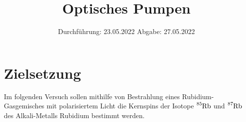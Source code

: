 

\def\Rb#1{\ce{^{#1}Rb}}

\subject{V21}
\title{Optisches Pumpen}
\date{
    Durchführung: 23.05.2022
     \hspace{3em}
    Abgabe: 27.05.2022
}


\maketitle
\thispagestyle{empty}
\tableofcontents
\newpage

\section{Zielsetzung}

    Im folgenden Versuch sollen mithilfe von Bestrahlung eines Rubidium-Gasgemisches mit polarisiertem Licht die Kernspins der Isotope $\ce{^{85}Rb}$ und $\ce{^{87}Rb}$ des Alkali-Metalls Rubidium bestimmt werden.


\clearpage


\clearpage


\clearpage


\clearpage

\printbibliography


